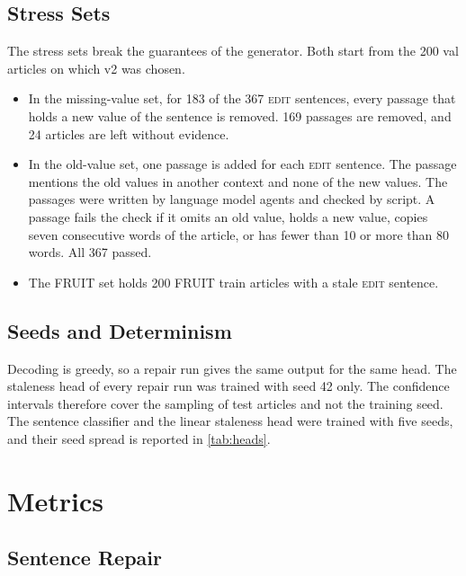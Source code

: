 \documentclass[]{paper}
\newcommand{\edit}{\textsc{edit}}
\begin{document}
\subsection{Stress Sets}

The stress sets break the guarantees of the generator. Both start from the 200 val articles on which v2 was chosen.
\begin{itemize}
\item In the missing-value set, for 183 of the 367 \edit{} sentences, every passage that holds a new value of the sentence is removed. 169 passages are removed, and 24 articles are left without evidence.
\item In the old-value set, one passage is added for each \edit{} sentence. The passage mentions the old values in another context and none of the new values. The passages were written by language model agents and checked by script. A passage fails the check if it omits an old value, holds a new value, copies seven consecutive words of the article, or has fewer than 10 or more than 80 words. All 367 passed.
\item The FRUIT set holds 200 FRUIT train articles with a stale \edit{} sentence.
\end{itemize}

\subsection{Seeds and Determinism}

Decoding is greedy, so a repair run gives the same output for the same head. The staleness head of every repair run was trained with seed 42 only. The confidence intervals therefore cover the sampling of test articles and not the training seed. The sentence classifier and the linear staleness head were trained with five seeds, and their seed spread is reported in \cref{tab:heads}.

\section{Metrics}
\label{sec:metrics}

\subsection{Sentence Repair}
\end{document}
